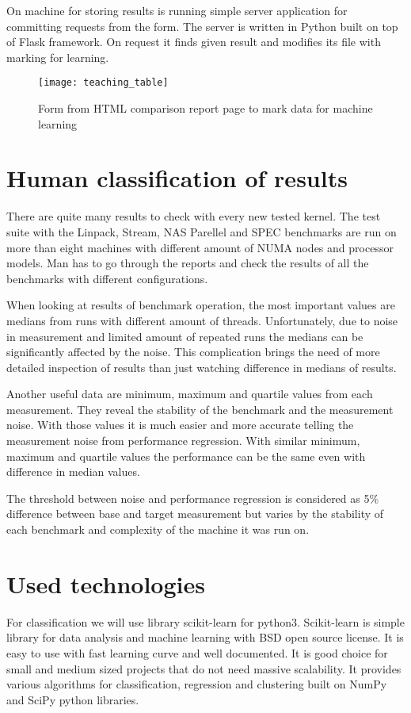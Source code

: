 On machine for storing results is running simple server application for
committing requests from the form. The server is written in Python built on top
of Flask framework. On request it finds given result and modifies its file with
marking for learning.

\begin{figure}
  \centering
  \texttt{[image: teaching\_table]}
  \caption{Form from HTML comparison report page to mark data for machine learning}
\end{figure}

\section{Human classification of results}
There are quite many results to check with every new tested kernel. The test
suite with the Linpack, Stream, NAS Parellel and SPEC benchmarks are run on more
than eight machines with different amount of NUMA nodes and processor models.
Man has to go through the reports and check the results of all the benchmarks
with different configurations.

When looking at results of benchmark operation, the most important values are
medians from runs with different amount of threads. Unfortunately, due to noise in measurement
and limited amount of repeated runs the medians can be significantly affected by
the noise. This complication brings the need of more detailed inspection of
results than just watching difference in medians of results.

Another useful data are minimum, maximum and quartile values from each
measurement. They reveal the stability of the benchmark and the measurement
noise. With those values it is much easier and more accurate telling the
measurement noise from performance regression. With similar minimum, maximum and
quartile values the performance can be the same even with difference in median values.

The threshold between noise and performance regression is considered as 5\%
difference between base and target measurement but varies by the stability of
each benchmark and complexity of the machine it was run on.

\section{Used technologies}
For classification we will use library scikit-learn for python3. Scikit-learn is
simple library for data analysis and machine learning with BSD open source
license. It is easy to use with fast learning curve and well documented. It is
good choice for small and medium sized projects that do not need massive
scalability. It provides various algorithms for classification, regression and
clustering built on NumPy and SciPy python libraries.

